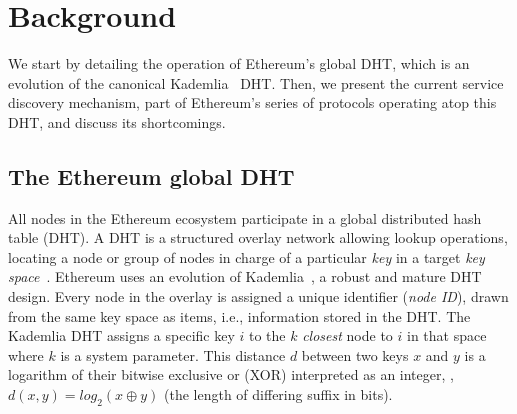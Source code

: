

\section{Background}
\label{sec:background}

We start by detailing the operation of Ethereum's global DHT, which is an evolution of the canonical Kademlia~\cite{maymounkov2002kademlia} DHT.
Then, we present the current service discovery mechanism, part of Ethereum's \discv series of protocols operating atop this DHT, and discuss its shortcomings.

\subsection{The Ethereum global DHT}
\label{sec:background:dht}

All nodes in the Ethereum ecosystem participate in a global distributed hash table (DHT).
A DHT is a structured overlay network allowing lookup operations, \ie locating a node or group of nodes in charge of a particular \emph{key} in a target \emph{key space}~\cite{chord,rowstron2001pastry}. Ethereum uses an evolution of Kademlia~\cite{maymounkov2002kademlia}, a robust and mature DHT design. %
Every node in the overlay is assigned a unique identifier (\emph{node ID}), drawn from the same key space as items, i.e., information stored in the DHT. %
The Kademlia DHT assigns a specific key $i$ to the $k$ \emph{closest} node to $i$ in that space where $k$ is a system parameter.
This distance $d$ between two keys $x$ and $y$ is a logarithm of their bitwise exclusive or (XOR) interpreted as an integer, \ie, $d(x,y) = \textit{log}_2(x \oplus y)$ (\ie the length of differing suffix in bits).

